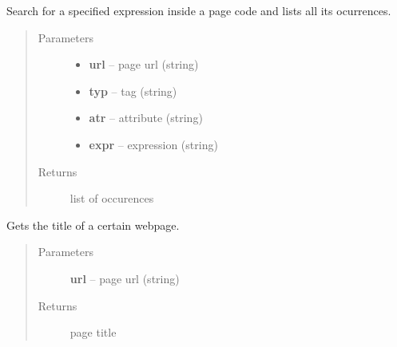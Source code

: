 \documentclass[letterpaper,10pt,english]{sphinxmanual}
\begin{document}

\begin{fulllineitems}
\label{index:BeFaVOr_web.find_regular_expression}
Search for a specified expression inside a page code and lists all
its ocurrences.
\begin{quote}\begin{description}
\item[{Parameters}] \leavevmode\begin{itemize}
\item {} 
\textbf{url} -- page url (string)

\item {} 
\textbf{typ} -- tag (string)

\item {} 
\textbf{atr} -- attribute (string)

\item {} 
\textbf{expr} -- expression (string)

\end{itemize}

\item[{Returns}] \leavevmode
list of occurences

\end{description}\end{quote}

\end{fulllineitems}


\begin{fulllineitems}
\label{index:BeFaVOr_web.getTitle}
Gets the title of a certain webpage.
\begin{quote}\begin{description}
\item[{Parameters}] \leavevmode
\textbf{url} -- page url (string)

\item[{Returns}] \leavevmode
page title

\end{description}\end{quote}

\end{fulllineitems}

\end{document}
